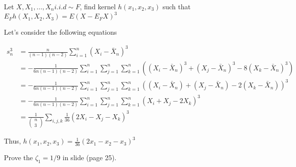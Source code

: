 \begin{problem}
    Let $X,X_1,\ldots,X_n i.i.d\sim F$, find kernel $h(x_1,x_2,x_3)$ such that $E_Fh(X_1,X_2,X_3)=E(X-E_FX)^3$
\end{problem}

\begin{solution}
    Let's consider the following equations

    \begin{equation}
        \begin{split} 
            s_n^3 
            & = \frac{n}{(n-1)(n-2)} \sum_{i=1}^n (X_i - \bar{X}_n)^3 \\
            & = - \frac{1}{6n(n-1)(n-2)} \sum_{i=1}^{n} \sum_{j=1}^{n} \sum_{k=1}^{n} \left(\left(X_{i}-\bar{X}_{n}\right)^{3} + \left(X_{j}-\bar{X}_{n}\right)^{3} - 8\left(X_{k}-\bar{X}_{n}\right)^{3}\right) \\ 
            & = - \frac{1}{6n(n-1)(n-2)} \sum_{i=1}^{n} \sum_{j=1}^{n} \sum_{k=1}^{n} \left(\left(X_{i}-\bar{X}_{n}\right) + \left(X_{j}-\bar{X}_{n}\right) - 2\left(X_{k}-\bar{X}_{n}\right) \right)^{3} \\ 
            & = - \frac{1}{6n(n-1)(n-2)} \sum_{i=1}^{n} \sum_{j=1}^{n} \sum_{k=1}^{n}  \left(X_{i}+X_{j} - 2X_k \right)^{3} \\ 
            & = \frac{1}{\left(
                \begin{matrix}
                    {n} \\ 
                    {3}
                \end{matrix}\right)} 
                \sum_{i,j,k} \frac{1}{36}\left(2X_{i}-X_{j}-X_k\right)^{3} 
        \end{split}
    \end{equation}

    Thus, $h(x_1,x_2,x_3)= \frac{1}{36}\left( 2x_1 - x_2 - x_3 \right)^{3}$

\end{solution}



\begin{problem}
    Prove the $\zeta_1=1/9$ in slide (page 25).
\end{problem}

